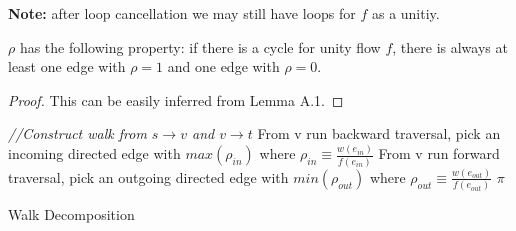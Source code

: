 \textbf{Note:} after loop cancellation we may still have loops for $f$ as a unitiy. 
\begin{lemma}
$\rho$ has the following property: if there is a cycle for unity flow $f$, there is always at least one edge with $\rho =1$ and one edge with $\rho =0$.
\end{lemma}
\begin{proof}
 This can be easily inferred from Lemma A.1.
\end{proof}



\begin{algorithm}[ht]
  \SetAlgoLined\DontPrintSemicolon
 \label{walk construction}
   \label{flow placement}
  \myalg{\walk{}}  {
\emph{//Construct walk from $s\rightarrow v$ and $v\rightarrow t$}\;
From v run backward traversal, pick an incoming directed edge with $ max( \rho_{in} )  $ where $\rho_{in} \equiv \frac{ w(e_{in})}{f(e_{in})}$\;
From v run forward traversal, pick an outgoing directed edge with $ min(\rho_{out} ) $ where $\rho_{out} \equiv \frac{ w(e_{out})}{f(e_{out})} $\;
 \KwRet $\pi$\;}{}
  \setcounter{AlgoLine}{0}
\caption{Walk Decomposition}
\end{algorithm}


